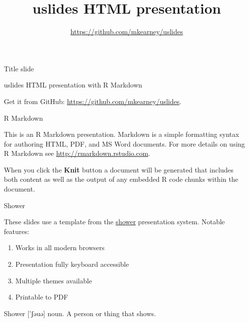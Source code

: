 \documentclass[ignorenonframetext,]{beamer}
\title{uslides HTML presentation}
\author{\url{https://github.com/mkearney/uslides}}
\date{}
\providecommand{\tightlist}{%
  \setlength{\itemsep}{0pt}\setlength{\parskip}{0pt}}
\begin{document}
\frame{\titlepage}


\begin{frame}
\tableofcontents[hideallsubsections]
\end{frame}
\begin{frame}{Title slide}
\protect\hypertarget{title-slide}{}

\end{frame}

\begin{frame}{uslides HTML presentation with R Markdown}
\protect\hypertarget{uslides-html-presentation-with-r-markdown}{}

Get it from GitHub: \url{https://github.com/mkearney/uslides}.

\end{frame}

\begin{frame}{R Markdown}
\protect\hypertarget{r-markdown}{}

This is an R Markdown presentation. Markdown is a simple formatting
syntax for authoring HTML, PDF, and MS Word documents. For more details
on using R Markdown see \url{http://rmarkdown.rstudio.com}.

When you click the \textbf{Knit} button a document will be generated
that includes both content as well as the output of any embedded R code
chunks within the document.

\end{frame}

\begin{frame}{Shower}
\protect\hypertarget{shower}{}

These slides use a template from the
\href{https://github.com/shower/shower}{shower} presentation system.
Notable features:

\begin{enumerate}
\tightlist
\item
  Works in all modern browsers
\item
  Presentation fully keyboard accessible
\item
  Multiple themes available
\item
  Printable to PDF
\end{enumerate}

Shower {[}'ʃəuə{]} noun. A person or thing that shows.

\end{frame}
\end{document}
